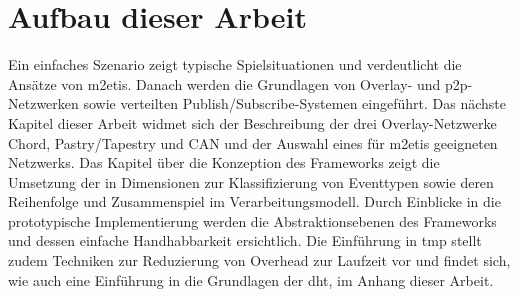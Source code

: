 \section*{Aufbau dieser Arbeit}
Ein einfaches Szenario zeigt typische Spielsituationen und verdeutlicht die Ansätze von \ac{m2etis}. Danach werden die Grundlagen von Overlay- und p2p-Netzwerken sowie verteilten Publish/Subscribe-Systemen eingeführt. Das nächste Kapitel dieser Arbeit widmet sich der Beschreibung der drei Overlay-Netzwerke Chord, Pastry/Tapestry und CAN und der Auswahl eines für \ac{m2etis} geeigneten Netzwerks. Das Kapitel über die Konzeption des Frameworks zeigt die Umsetzung der in  Dimensionen zur Klassifizierung von Eventtypen sowie deren Reihenfolge und Zusammenspiel im Verarbeitungsmodell. Durch Einblicke in die prototypische Implementierung werden die Abstraktionsebenen des Frameworks und dessen einfache Handhabbarkeit ersichtlich. Die Einführung in \ac{tmp} stellt zudem Techniken zur Reduzierung von Overhead zur Laufzeit vor und findet sich, wie auch eine Einführung in die Grundlagen der \ac{dht}, im Anhang dieser Arbeit.
